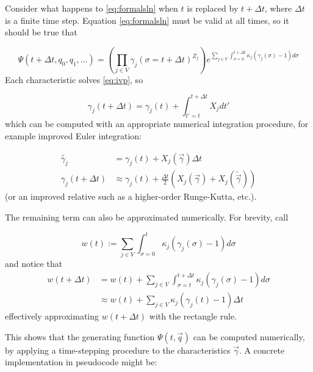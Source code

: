 \documentclass{article}
\begin{document}
Consider what happens to \eqref{eq:formalsln} when $t$ is replaced by $t +
\Delta t$, where $\Delta t$ is a finite time step. Equation \eqref{eq:formalsln}
must be valid at all times, so it should be true that

\begin{equation}
    \Psi(t + \Delta t,q_0,q_1,\dots) = \left(\prod_{j \in V}
    \gamma_j(\sigma=t + \Delta t)^{Z_j}\right)
    e^{\sum_{j \in V} \int_{\sigma=0}^{t + \Delta t} \kappa_j (\gamma_j(\sigma)-1) d\sigma}
\end{equation}
Each characteristic solves \eqref{eq:ivp}, so

\begin{equation}
    \gamma_j(t+\Delta t) = \gamma_j(t) + \int_{t'=t}^{t+\Delta t} X_j dt'
\end{equation}
which can be computed with an appropriate numerical integration procedure, for
example improved Euler integration:

\begin{align}
    \tilde{\gamma_j} &= \gamma_j(t) + X_j(\vec{\gamma}) \Delta t \nonumber \\
    \gamma_j(t+\Delta t) &\approx \gamma_j(t) + \frac{\Delta t}{2}
    (X_j(\vec{\gamma}) + X_j(\tilde{\vec{\gamma}}))
\end{align}
(or an improved relative such as a higher-order Runge-Kutta, etc.).

The remaining term can also be approximated numerically. For brevity, call

\begin{equation}
    w(t) := {\sum_{j \in V} \int_{\sigma=0}^{t} \kappa_j (\gamma_j(\sigma)-1) d\sigma}
\end{equation}
and notice that
\begin{align}
    w(t + \Delta t)
    &= w(t) +
    \sum_{j \in V} \int_{\sigma=t}^{t + \Delta t} \kappa_j (\gamma_j(\sigma)-1) d\sigma
    \nonumber \\
    &\approx  w(t) + \sum_{j \in V} \kappa_j (\gamma_j(t)-1) \Delta t
\end{align}
effectively approximating $w(t+\Delta t)$ with the rectangle rule.

This shows that the generating function $\Psi(t, \vec{q})$ can be computed
numerically, by applying a time-stepping procedure to the characteristics
$\vec{\gamma}$. A concrete implementation in pseudocode might be:
\end{document}
